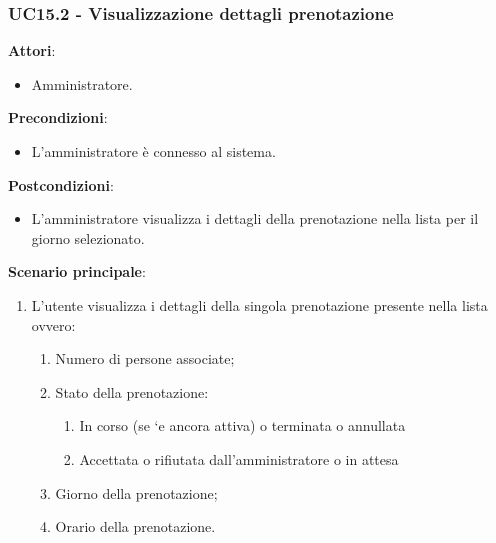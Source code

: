 \subsubsection{UC15.2 - Visualizzazione dettagli prenotazione}\label{usecase:15_2}
\textbf{Attori}:
\begin{itemize}
    \item Amministratore.
\end{itemize}
\textbf{Precondizioni}:
\begin{itemize}
    \item L'amministratore è connesso al sistema.
\end{itemize}
\textbf{Postcondizioni}:
\begin{itemize}
    \item L'amministratore visualizza i dettagli della prenotazione nella lista per il giorno selezionato.
\end{itemize}
\textbf{Scenario principale}:
\begin{enumerate}
    \item L'utente visualizza i dettagli della singola prenotazione presente nella lista ovvero:
    \begin{enumerate}
        \item Numero di persone associate;
        \item Stato della prenotazione:
         \begin{enumerate}
           \item In corso (se `e ancora attiva) o terminata o annullata
            \item Accettata o rifiutata dall’amministratore o in attesa
       \end{enumerate}
    \item Giorno della prenotazione;
    \item Orario della prenotazione.
    \end{enumerate}
\end{enumerate}
\newpage